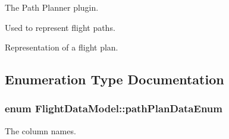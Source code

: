 \-The \-Path \-Planner plugin.

\-Used to represent flight paths.

\-Representation of a flight plan. 

\subsection{\-Enumeration \-Type \-Documentation}
\hypertarget{group___path_gaa0908516cbd02b164b605fce903d9066}{
\subsubsection[{path\-Plan\-Data\-Enum}]{\setlength{\rightskip}{0pt plus 5cm}enum {\bf \-Flight\-Data\-Model\-::path\-Plan\-Data\-Enum}}}\label{group___path_gaa0908516cbd02b164b605fce903d9066}


\-The column names. 

